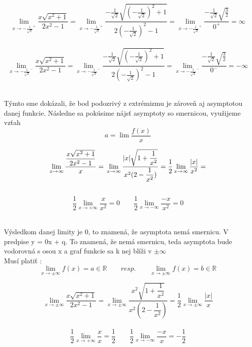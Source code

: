 \documentclass[a4paper]{article}
\begin{document}
	\[ \lim_{x \to {-\frac{1}{\sqrt 2}}^+}  \dfrac{x \sqrt{x^2+1}}{2x^2-1} = 
	\lim_{x \to {-\frac{1}{\sqrt 2}}^+}  \dfrac{-\frac{1}{\sqrt 2} \sqrt{(-\frac{1}{\sqrt 2})^2+1}}{2(-\frac{1}{\sqrt 2})^2-1} =
	\lim_{x \to {-\frac{1}{\sqrt 2}}^+}  \dfrac{-\frac{1}{\sqrt 2} \sqrt{\frac{3}{2}}}{0^+} = \infty \]\\
	
	
	\[ \lim_{x \to {-\frac{1}{\sqrt 2}}^-}  \dfrac{x \sqrt{x^2+1}}{2x^2-1} = 
	\lim_{x \to {-\frac{1}{\sqrt 2}}^-}  \dfrac{-\frac{1}{\sqrt 2} \sqrt{(-\frac{1}{\sqrt 2})^2+1}}{2(-\frac{1}{\sqrt 2})^2-1} =
	\lim_{x \to {-\frac{1}{\sqrt 2}}^-}  \dfrac{-\frac{1}{\sqrt 2} \sqrt{\frac{3}{2}}}{0^-} = -\infty \]\\
	
	\begin{center}
	Týmto sme dokázali, že bod podozrivý z extrémizmu je zároveň aj asymptotou danej funkcie.
	Následne sa pokúsime nájsť asymptoty so smernicou, využijeme vzťah \[a=\lim \dfrac{f(x)}{x}\]
	\end{center}
	
	\[ \lim_{x \to \infty}  \dfrac{\dfrac{x \sqrt{x^2+1}}{2x^2-1}}{x} = \\
	\lim_{x \to \infty}  \dfrac{|x| \sqrt{1+\dfrac{1}{x^2}}}{x^2(2-\dfrac{1}{x^2})} = \\
	\dfrac{1}{2} \lim_{x \to \infty} \dfrac{|x|}{x^2} = \]\\
	
	\[ \dfrac{1}{2}\lim_{x \to +\infty} \dfrac{x}{x^2} = 0 \qquad \dfrac{1}{2}\lim_{x \to -\infty} \dfrac{-x}{x^2} = 0\] \\
	
	\begin{center}
	Výsledkom danej limity je 0, to znamená, že asymptota nemá smernicu. V predpise y = 0x + q.
	To znamená, že nemá smernicu, teda asymptota bude vodorovná s osou x a graf funkcie sa k nej blíži v $\pm\infty$\\
	Musí platiť : 
	\[ \lim_{x \to \pm \infty} f(x)= a \in \mathbb{R} \qquad resp. \qquad \lim_{x \to \pm \infty} f(x)= b \in \mathbb{R} \] 
	\end{center}
	\[ \lim_{x \to \pm \infty}  \dfrac{x \sqrt{x^2+1}}{2x^2-1} = \lim_{x \to \pm \infty} \dfrac{x^2 \sqrt{1+\dfrac{1}{x^2}}}{x^2(2-\dfrac{1}{x^2})} = \dfrac{1}{2}\lim_{x \to \pm\infty} \dfrac{|x|}{x}  \]\\
	
	\[ \dfrac{1}{2}\lim_{x \to +\infty} \dfrac{x}{x} = \dfrac{1}{2} \qquad \dfrac{1}{2}\lim_{x \to -\infty} \dfrac{-x}{x} = -\dfrac{1}{2}\] \\
	
\end{document}
